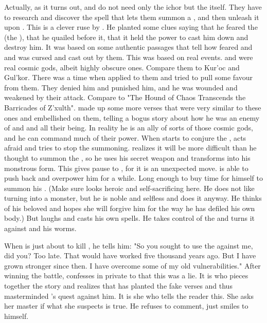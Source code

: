 Actually, as it turns out, \Teshrial and \Urizeth do not need only the ichor but the \malgryph itself.
They have to research and discover the spell that lets them summon a \malgryph, and then unleash it upon \Ishnaruchaefir.
This is a clever ruse by \Ishnaruchaefir. 
He planted some clues saying that he feared the \malgryph (the ), that he quailed before it, that it held the power to cast him down and destroy him.
It was based on some authentic \WanderersInDarknessEmph passages that tell how \Ishnaruchaefir feared \Zaz and \Urzaz and was cursed and cast out by them.
This was based on real events.
\Zaz and \Urzaz were real cosmic gods, albeit highly obscure ones. 
Compare them to Kur'oc and Gul'kor.
There was a time when \Ishnaruchaefir applied to them and tried to pull some favour from them. 
They denied him and punished him, and he was wounded and weakened by their attack.
Compare to "The Hound of Chaos Transcends the Barricades of Z'xulth".
\Ishnaruchaefir made up some more \WanderersInDarknessEmph verses that were very similar to these ones and embellished on them, telling a bogus story about how he was an enemy of \Zaz and \Urzaz and all their being. 
In reality he is an ally of sorts of those cosmic gods, and he can command much of their power.
When \Teshrial starts to conjure the \malgryph, \Ishnaruchaefir acts afraid and tries to stop the summoning.
\Teshrial realizes it will be more difficult than he thought to summon the \malgryph, so he uses his secret weapon and transforms into his monstrous form.
This gives pause to \Ishnaruchaefir, for it is an unexpected move. 
\Teshrial is able to push back \Ishnaruchaefir and overpower him for a while. 
Long enough to buy time for himself to summon his \malgryph.
(Make sure \Teshrial looks heroic and self-sacrificing here. He does not like turning into a monster, but he is noble and selfless and does it anyway. He thinks of his beloved and hopes she will forgive him for the way he has defiled his own body.)
But \Ishnaruchaefir laughs and casts his own spells.
He takes control of the \malgryph and turns it against \Teshrial and his worms.

When \Ishnaruchaefir is just about to kill \Teshrial, he tells him:
"So you sought to use the \malgryph against me, did you? Too late. That would have worked five thousand years ago. But I have grown stronger since then. I have overcome some of my old vulnerabilities."
After winning the battle, \Ishnaruchaefir confesses in private to \Criseis that this was a lie. 
It is \Criseis who pieces together the story and realizes that \Ishnaruchaefir has planted the fake \WanderersInDarknessEmph verses and thus masterminded \Teshrial's quest against him. 
It is she who tells the reader this.
She asks her master if what she suspects is true. 
He refuses to comment, just smiles to himself.

